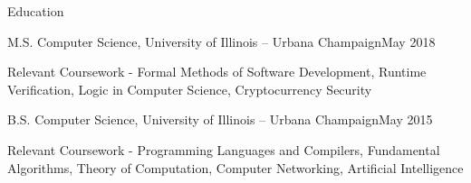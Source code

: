 \documentclass{resume} %
\begin{document}
 

\begin{rSection}{Education}
\begin{rSubsection}{ M.S. Computer Science, University of Illinois -- Urbana Champaign}{May 2018}{}{}
\item Relevant Coursework - Formal Methods of Software Development, Runtime Verification, Logic in Computer Science, Cryptocurrency Security 
\end{rSubsection}
\begin{rSubsection}{ B.S. Computer Science, University of Illinois -- Urbana Champaign}{May 2015}{}{}
\item Relevant Coursework - Programming Languages and Compilers, Fundamental Algorithms, Theory of Computation, Computer Networking, Artificial Intelligence
\end{rSubsection}
\end{rSection}
\end{document}

